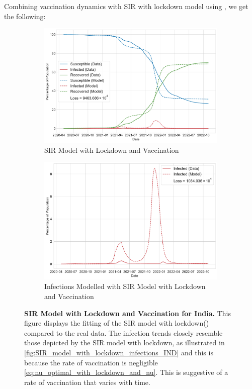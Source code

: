 \documentclass[tikz,fleqn,12pt]{wlscirep}
\begin{document}
Combining vaccination dynamics with SIR with lockdown model using , we get the following:
\begin{figure}[htbp!]
  \centering
  \begin{subfigure}[t]{\textwidth}
    \centering
    \includegraphics[scale=0.50]{images/SIR_model_with_lockdown_with_vaccination_IND.pdf}
    \caption{SIR Model with Lockdown and Vaccination}
    \label{fig:SIR_model_with_lockdown_with_vaccination_IND}
  \end{subfigure}

  \begin{subfigure}[t]{\textwidth}
    \centering
    \includegraphics[scale=0.50]{images/SIR_model_with_lockdown_with_vaccination_infections_IND.pdf}
    \caption{Infections Modelled with SIR Model with Lockdown and Vaccination}
    \label{fig:SIR_model_with_lockdown_with_vaccination_infections_IND}
  \end{subfigure}
  \caption{\textbf{SIR Model with Lockdown and Vaccination for India.} This figure displays the fitting of the SIR model with lockdown() compared to the real data. The infection trends closely resemble those depicted by the SIR model with lockdown, as illustrated in \cref{fig:SIR_model_with_lockdown_infections_IND} and this is because the rate of vaccination is negligible \cref{eq:nu_optimal_with_lockdown_and_nu}. This is suggestive of a rate of vaccination that varies with time.}
\end{figure}
\end{document}
